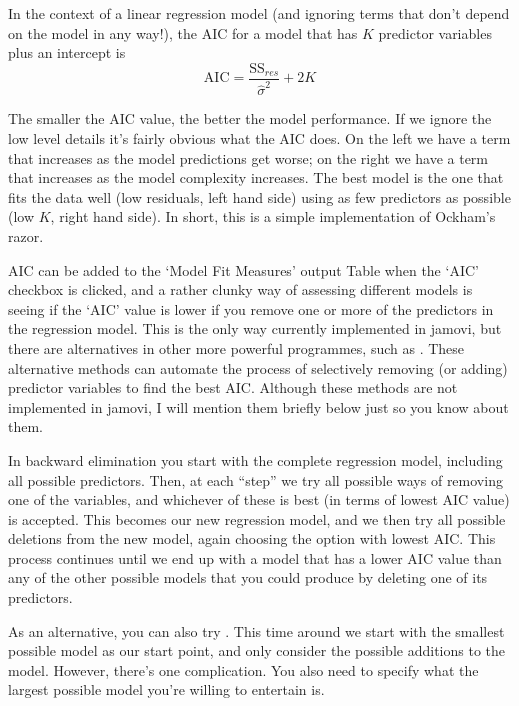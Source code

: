 \vspace{0.5cm}
\begin{mdframed}[style=MyFrame,nobreak=true]
In the context of a linear regression model (and ignoring terms that don't depend on the model in any way!), the AIC for a model that has $K$ predictor variables plus an intercept is
$$
\mbox{AIC} = \displaystyle\frac{\mbox{SS}_{res}}{\hat{\sigma}^2} + 2K
$$
\end{mdframed}

The smaller the AIC value, the better the model performance. If we ignore the low level details it's fairly obvious what the AIC does. On the left we have a term that increases as the model predictions get worse; on the right we have a term that increases as the model complexity increases. The best model is the one that fits the data well (low residuals, left hand side) using as few predictors as possible (low $K$, right hand side). In short, this is a simple implementation of Ockham's razor. 

AIC can be added to the `Model Fit Measures' output Table when the `AIC' checkbox is clicked, and a rather clunky way of assessing different models is seeing if the `AIC' value is lower if you remove one or more of the predictors in the regression model. This is the only way currently implemented in jamovi, but there are alternatives in other more powerful programmes, such as \R. These alternative methods can automate the process of selectively removing (or adding) predictor variables to find the best AIC. Although these methods are not implemented in jamovi, I will mention them briefly below just so you know about them.


In backward elimination you start with the complete regression model, including all possible predictors. Then, at each ``step'' we try all possible ways of removing one of the variables, and whichever of these is best (in terms of lowest AIC value) is accepted. This becomes our new regression model, and we then try all possible deletions from the new model, again choosing the option with lowest AIC. This process continues until we end up with a model that has a lower AIC value than any of the other possible models that you could produce by deleting one of its predictors. 


As an alternative, you can also try . This time around we start with the smallest possible model as our start point, and only consider the possible additions to the model. However, there's one complication. You also need to specify what the largest possible model you're willing to entertain is.

